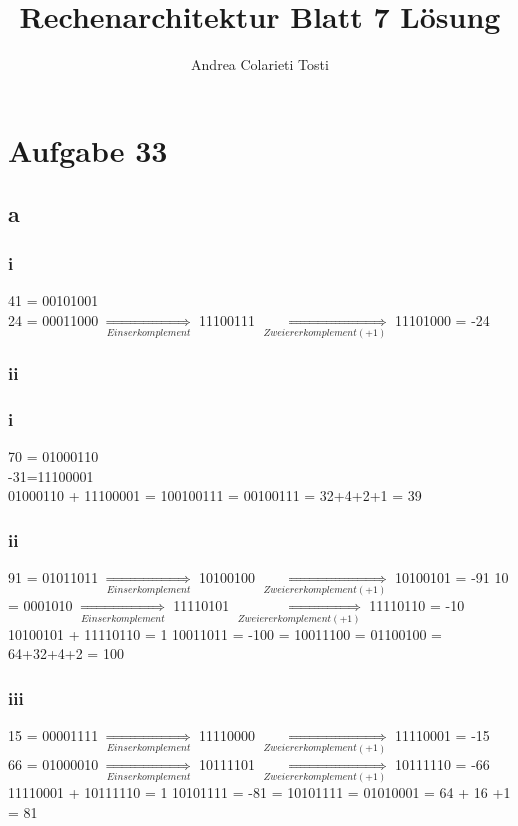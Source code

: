 \documentclass[10pt,a4paper]{article}
\author{Andrea Colarieti Tosti}
\title{Rechenarchitektur Blatt 7 Lösung}
\begin{document}
\maketitle
\section{Aufgabe 33}
\subsection{a}
\subsubsection{i}
41 = 00101001 \\
24 = 00011000 $ \underset{Einserkomplement}{\Rightarrow}$ 11100111 $ \underset{Zweiererkomplement (+1)}{\Rightarrow}$ 11101000 = -24
\subsubsection{ii}
\subsubsection*{i}
70 = 01000110 \\ -31=11100001\\
01000110 + 11100001 = 100100111 = 00100111 = 32+4+2+1 = 39
\subsubsection*{ii}
91 = 01011011 $ \underset{Einserkomplement}{\Rightarrow}$ 10100100 $ \underset{Zweiererkomplement (+1)}{\Rightarrow}$ 10100101 = -91
10 = 0001010 $ \underset{Einserkomplement}{\Rightarrow}$ 11110101 $ \underset{Zweiererkomplement (+1)}{\Rightarrow}$ 11110110  = -10\\
10100101 + 11110110 = 1 10011011 = -100 = 10011100 = 01100100 = 64+32+4+2 = 100
\subsubsection*{iii}
15 = 00001111 $ \underset{Einserkomplement}{\Rightarrow}$ 11110000 $ \underset{Zweiererkomplement (+1)}{\Rightarrow}$ 11110001  = -15\\
66 = 01000010 $ \underset{Einserkomplement}{\Rightarrow}$ 10111101 $ \underset{Zweiererkomplement (+1)}{\Rightarrow}$ 10111110  = -66\\
11110001 + 10111110 = 1 10101111 = -81 = 10101111 = 01010001 = 64 + 16 +1 = 81
\end{document}

